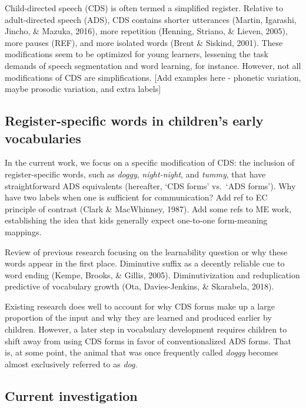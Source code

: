 \documentclass[10pt, letterpaper]{article}
\begin{document}
Child-directed speech (CDS) is often termed a simplified register.
Relative to adult-directed speech (ADS), CDS contains shorter utterances
(Martin, Igarashi, Jincho, \& Mazuka, 2016), more repetition (Henning,
Striano, \& Lieven, 2005), more pauses (REF), and more isolated words
(Brent \& Siskind, 2001). These modifications seem to be optimized for
young learners, lessening the task demands of speech segmentation and
word learning, for instance. However, not all modifications of CDS are
simplifications. {[}Add examples here - phonetic variation, maybe
prosodic variation, and extra labels{]}

\hypertarget{register-specific-words-in-childrens-early-vocabularies}{%
\subsection{Register-specific words in children's early
vocabularies}\label{register-specific-words-in-childrens-early-vocabularies}}

In the current work, we focus on a specific modification of CDS: the
inclusion of register-specific words, such as \emph{doggy},
\emph{night-night}, and \emph{tummy}, that have straightforward ADS
equivalents (hereafter, `CDS forms' vs.~`ADS forms'). Why have two
labels when one is sufficient for communication? Add ref to EC principle
of contrast (Clark \& MacWhinney, 1987). Add some refs to ME work,
establishing the idea that kids generally expect one-to-one form-meaning
mappings.

Review of previous research focusing on the learnability question or why
these words appear in the first place. Diminutive suffix as a decently
reliable cue to word ending (Kempe, Brooks, \& Gillis, 2005).
Diminutivization and reduplication predictive of vocabulary growth (Ota,
Davies-Jenkins, \& Skarabela, 2018).

Existing research does well to account for why CDS forms make up a large
proportion of the input and why they are learned and produced earlier by
children. However, a later step in vocabulary development requires
children to shift away from using CDS forms in favor of conventionalized
ADS forms. That is, at some point, the animal that was once frequently
called \emph{doggy} becomes almost exclusively referred to as
\emph{dog}.

\hypertarget{current-investigation}{%
\subsection{Current investigation}\label{current-investigation}}
\end{document}
